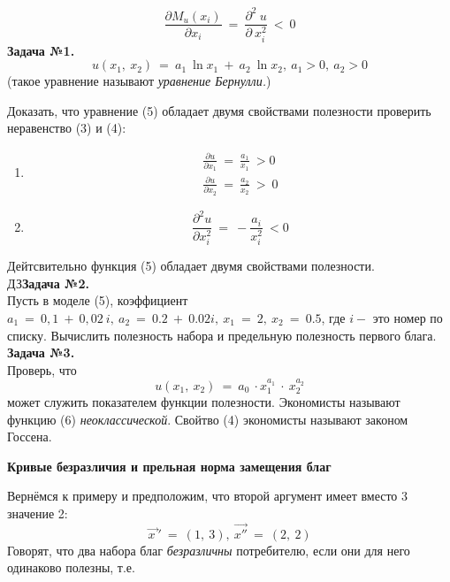 \documentclass[12pt,a4paper]{article}
\begin{document}
\begin{equation}
\frac{\partial M_{u}( x_{i})}{\partial x_{i}} \ =\ \frac{\partial ^{2} \ u}{\partial \ x^{2}_{i}} \ < \ 0
\end{equation}
\textbf{Задача №1.}
\begin{equation}
u( x_{1} ,\ x_{2}) \ =\ a_{1} \ \ln x_{1} \ +\ a_{2} \ \ln x_{2} ,\ a_{1}  >0,\ a_{2}  >0
\end{equation}
(такое уравнение называют \textit{уравнение Бернулли.})

Доказать, что уравнение (5) обладает двумя свойствами полезности проверить неравенство (3) и (4):
\begin{enumerate}
\item {\begin{gather}
\frac{\partial u}{\partial x_{1}} \ =\ \frac{a_{1}}{x_{1}} \  >0\\
\frac{\partial u}{\partial x_{2}} \ =\ \frac{a_{2}}{x_{2}} \  >\ 0
\end{gather}}
\item {
 $$\frac{\partial ^{2} u}{\partial x^{2}_{i}} \ =\ -\frac{a_{i}}{x^{2}_{i}} \ < 0$$
}
\end{enumerate}
Дейтсвительно функция (5) обладает двумя свойствами полезности.\\
$\displaystyle \boxed{\text{ДЗ}}$\textbf{Задача №2. }\\
Пусть в моделе (5), коэффициент $\displaystyle a_{1} \ =\ 0,1\ +\ 0,02\ i,\ a_{2} \ =\ 0.2\ +\ 0.02i,\ x_{1} \ =\ 2,\ x_{2} \ =\ 0.5$, где $i -$ это номер по списку. Вычислить полезность набора и предельную полезность первого блага. \\
\textbf{Задача №3.} \\
Проверь, что
\begin{equation}
u( x_{1} ,\ x_{2}) \ =\ a_{0} \ \cdot x^{a_{1}}_{1} \ \cdot \ x^{a_{2}}_{2}
\end{equation}
может служить показателем функции полезности. Экономисты называют функцию (6) \textit{неоклассической}. Свойтво (4) экономисты называют законом Госсена.
\begin{center}
\textbf{Кривые безразличия и прельная норма замещения благ}

\end{center}
	Вернёмся к примеру и предположим, что второй аргумент имеет вместо 3 значение 2:
\begin{equation}
\overrightarrow{x\ } '\ =\ ( 1,\ 3) ,\ \overrightarrow{x''} \ =\ ( 2,\ 2)
\end{equation}
	Говорят, что два набора благ \textit{безразличны} потребителю, если они для него одинаково полезны, т.е.
\end{document}
